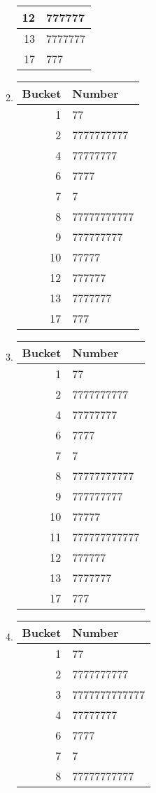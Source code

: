 \documentclass[12pt]{article}
\begin{document}
\begin{enumerate}[a]
\begin{multicols}{2}
\begin{enumerate}[1]
\begin{tabular}{r|l}
			12 & 777777\\\hline
			13 & 7777777\\\hline
			17 & 777
		\end{tabular}
		\item
		\begin{tabular}{r|l}
			Bucket & Number\\\hline\hline
			1 & 77\\\hline
			2 & 7777777777\\\hline
			4 & 77777777\\\hline
			6 & 7777\\\hline
			7 & 7\\\hline
			8 & 77777777777\\\hline
			9 & 777777777\\\hline
			10 & 77777\\\hline
			12 & 777777\\\hline
			13 & 7777777\\\hline
			17 & 777
		\end{tabular}
		\item
		\begin{tabular}{r|l}
			Bucket & Number\\\hline\hline
			1 & 77\\\hline
			2 & 7777777777\\\hline
			4 & 77777777\\\hline
			6 & 7777\\\hline
			7 & 7\\\hline
			8 & 77777777777\\\hline
			9 & 777777777\\\hline
			10 & 77777\\\hline
			11 & 777777777777\\\hline
			12 & 777777\\\hline
			13 & 7777777\\\hline
			17 & 777
		\end{tabular}
		\item
		\begin{tabular}{r|l}
			Bucket & Number\\\hline\hline
			1 & 77\\\hline
			2 & 7777777777\\\hline
			3 & 7777777777777\\\hline
			4 & 77777777\\\hline
			6 & 7777\\\hline
			7 & 7\\\hline
			8 & 77777777777\\\hline

\end{tabular}
\end{enumerate}
\end{multicols}
\end{enumerate}
\end{document}
